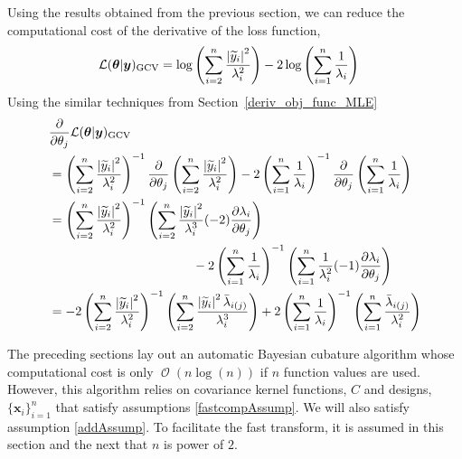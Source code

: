 \documentclass{iitthesis}          %
\DeclareMathOperator{\Order}{{\mathcal O}}
\newcommand{\bm}[1]{\boldsymbol{#1}}
\newcommand{\vtheta}{{\bm{\theta}}}
\newcommand{\vx}{\bm{x}}
\newcommand{\vy}{\bm{y}}
\newcommand{\GCV}{\textup{GCV}}
\def\abs#1{\ensuremath{\left \lvert #1 \right \rvert}}
\newcommand\secref{Section~\ref}
\begin{document}
Using the results obtained from the previous section, we can reduce the computational cost of the derivative of the loss function,
\begin{align*}
\mathcal{L}(\vtheta | \vy)_\GCV
&= \log \left ( \sum_{i=2}^n \frac{\abs{\widetilde{y}_i}^2}{\lambda_i^2} 
\right) -2\log\left( \sum_{i=1}^n \frac{1}{\lambda_i} \right)
\end{align*}
Using the similar techniques from \secref{deriv_obj_func_MLE}
\begin{align*}
& \frac{\partial}{\partial \theta_j}  \mathcal{L}(\vtheta | \vy)_\GCV
\\
&= \left ( \sum_{i=2}^n \frac{\abs{\widetilde{y}_i}^2}{\lambda_i^2} \right)^{-1}
\frac{\partial}{\partial \theta_j} \left ( \sum_{i=2}^n \frac{\abs{\widetilde{y}_i}^2}{\lambda_i^2} \right)
 -2 \left( \sum_{i=1}^n \frac{1}{\lambda_i} \right)^{-1}
\frac{\partial}{\partial \theta_j} \left( \sum_{i=1}^n \frac{1}{\lambda_i} \right)
\\
&= \left ( \sum_{i=2}^n \frac{\abs{\widetilde{y}_i}^2}{\lambda_i^2} \right)^{-1}
 \left ( \sum_{i=2}^n \frac{\abs{\widetilde{y}_i}^2}{\lambda_i^3} (-2) \frac{\partial\lambda_i}{\partial \theta_j}  \right)
\\ & \hspace{4cm} 
-2 \left( \sum_{i=1}^n \frac{1}{\lambda_i} \right)^{-1}
\left( \sum_{i=1}^n \frac{1}{\lambda_i^2} (-1)\frac{\partial \lambda_i}{\partial \theta_j}  \right)
\\
&= -2 \left ( \sum_{i=2}^n \frac{\abs{\widetilde{y}_i}^2}{\lambda_i^2} \right)^{-1}
\left ( \sum_{i=2}^n \frac{\abs{\widetilde{y}_i}^2 \bar{\lambda}_{i(j)} }{\lambda_i^3}    \right)
+ 2 \left( \sum_{i=1}^n \frac{1}{\lambda_i} \right)^{-1}
\left( \sum_{i=1}^n \frac{\bar{\lambda}_{i(j)} }{\lambda_i^2}  \right)
\end{align*}








\label{sec:shift_invariant_kernel}

The preceding sections lay out an automatic Bayesian cubature algorithm whose computational cost is only $\Order(n \log(n))$ if $n$ function values are used.  However, this algorithm relies on covariance kernel functions, $C$ and designs, $\{\vx_i\}_{i=1}^n$ that satisfy assumptions \eqref{fastcompAssump}.  We will also satisfy assumption \eqref{addAssump}.  To facilitate the fast transform, it is assumed in this section and the next that $n$ is power of $2$.  
\end{document}
